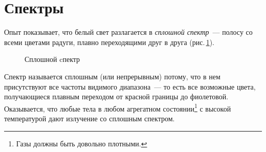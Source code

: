 \documentclass[main.tex]{subfiles}
\begin{document}

 

 

 
   

\section{Спектры}


Опыт показывает, что белый свет разлагается в \emph{сплошной спектр}~--- полосу со всеми цветами радуги, плавно переходящими друг в друга (рис.\,\ref{fig:p202}).

    \begin{figure}[H]
    \centering

\caption{Сплошной cпектр}
\label{fig:p202}
\end{figure}


Спектр называется сплошным (или непрерывным) потому, что в нем присутствуют все частоты видимого диапазона~--- то есть все возможные цвета, получающиеся плавным переходом от красной границы до фиолетовой. Оказывается, что любые тела в любом агрегатном состоянии\footnote{Газы должны быть довольно плотными.} с высокой температурой дают излучение со сплошным спектром.
\end{document}
